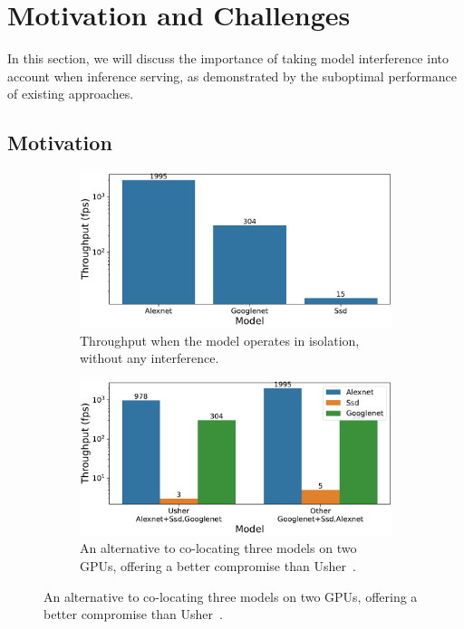 \section{Motivation and Challenges}\label{sec:motivation}


In this section, we will discuss the importance of taking model interference
into account when inference serving, as demonstrated by the suboptimal
performance of existing approaches.


\subsection{Motivation}


\begin{figure}
	\centering
	\begin{subfigure}[b]{0.3\textwidth}
		\centering
		\includegraphics[width=\textwidth]{chapters/roomie/images/Throughput_models_in_isolation.pdf}
		\caption{Throughput when the model operates in isolation, without any interference.}
		\label{fig:isolation}
	\end{subfigure}
	\hfill
	\begin{subfigure}[b]{0.3\textwidth}
		\centering
		\includegraphics[width=\textwidth]{chapters/roomie/images/Throughput_models_in_combinaison.pdf}
		\caption{An alternative to co-locating three models on two GPUs, offering a better compromise than Usher~\cite{shubha2024usher}.}
		\label{fig:colocation}
	\end{subfigure}
	\label{fig:three graphs}
\end{figure}

